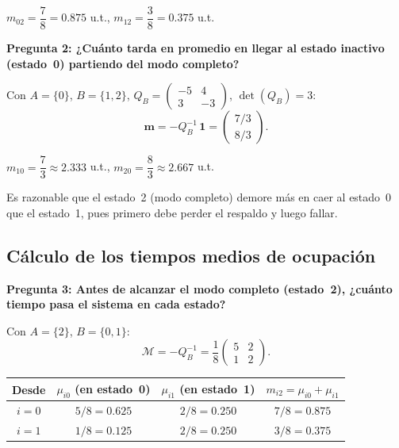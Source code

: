 \documentclass[11pt, letterpaper]{article}
\begin{document}
\begin{resultadobox}
  $m_{02} = \dfrac{7}{8} = 0.875$ u.t., \quad
  $m_{12} = \dfrac{3}{8} = 0.375$ u.t.
\end{resultadobox}

\medskip
\textbf{Pregunta 2: ¿Cuánto tarda en promedio en llegar al estado
inactivo (estado~0) partiendo del modo completo?}

Con $A=\{0\}$, $B=\{1,2\}$, $Q_B = \begin{pmatrix} -5 & 4 \\ 3 & -3 \end{pmatrix}$,
$\det(Q_B)=3$:
\[
  \mathbf{m} = -Q_B^{-1}\,\mathbf{1}
  = \begin{pmatrix} 7/3 \\ 8/3 \end{pmatrix}.
\]

\begin{resultadobox}
  $m_{10} = \dfrac{7}{3} \approx 2.333$ u.t., \quad
  $m_{20} = \dfrac{8}{3} \approx 2.667$ u.t.
\end{resultadobox}

Es razonable que el estado~2 (modo completo) demore más en caer al
estado~0 que el estado~1, pues primero debe perder el respaldo y
luego fallar.

\subsection{Cálculo de los tiempos medios de ocupación}

\textbf{Pregunta 3: Antes de alcanzar el modo completo (estado~2),
¿cuánto tiempo pasa el sistema en cada estado?}

Con $A=\{2\}$, $B=\{0,1\}$:
\[
  \mathcal{M} = -Q_B^{-1}
  = \frac{1}{8}\begin{pmatrix} 5 & 2 \\ 1 & 2 \end{pmatrix}.
\]

\begin{resultadobox}
\begin{center}
\renewcommand{\arraystretch}{1.4}
\begin{tabular}{c|cc|c}
  \toprule
  \textbf{Desde} & $\mu_{i0}$ (en estado~0) & $\mu_{i1}$ (en estado~1)
  & $m_{i2}=\mu_{i0}+\mu_{i1}$\\
  \midrule
  $i=0$ & $5/8=0.625$ & $2/8=0.250$ & $7/8=0.875$\\
  $i=1$ & $1/8=0.125$ & $2/8=0.250$ & $3/8=0.375$\\
  \bottomrule
\end{tabular}
\end{center}
\end{resultadobox}
\end{document}
